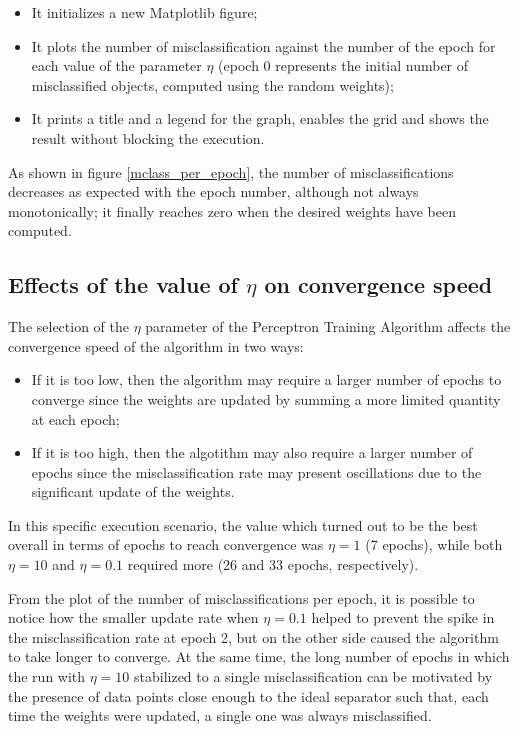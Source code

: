 \documentclass[letterpaper,headings=standardclasses]{scrartcl}
\begin{document}
\begin{itemize}

\item It initializes a new Matplotlib figure;

\item It plots the number of misclassification against the number of the epoch for each value of the parameter $\eta$ (epoch 0 represents the initial number of misclassified objects, computed using the random weights);

\item It prints a title and a legend for the graph, enables the grid and shows the result without blocking the execution.

\end{itemize}

As shown in figure \ref{mclass_per_epoch}, the number of misclassifications decreases as expected with the epoch number, although not always monotonically; it finally reaches zero when the desired weights have been computed.

\subsection{Effects of the value of $\eta$ on convergence speed}

The selection of the $\eta$ parameter of the Perceptron Training Algorithm affects the convergence speed of the algorithm in two ways:

\begin{itemize}

\item If it is too low, then the algorithm may require a larger number of epochs to converge since the weights are updated by summing a more limited quantity at each epoch;

\item If it is too high, then the algotithm may also require a larger number of epochs since the misclassification rate may present oscillations due to the significant update of the weights.

\end{itemize}

In this specific execution scenario, the value which turned out to be the best overall in terms of epochs to reach convergence was $\eta = 1$ (7 epochs), while both $\eta = 10$ and $\eta = 0.1$ required more (26 and 33 epochs, respectively).

From the plot of the number of misclassifications per epoch, it is possible to notice how the smaller update rate when $\eta = 0.1$ helped to prevent the spike in the misclassification rate at epoch 2, but on the other side caused the algorithm to take longer to converge. At the same time, the long number of epochs in which the run with $\eta = 10$ stabilized to a single misclassification can be motivated by the presence of data points close enough to the ideal separator such that, each time the weights were updated, a single one was always misclassified.
\end{document}
